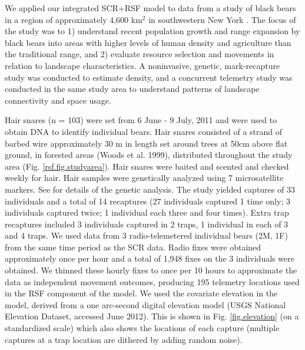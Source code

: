 \documentclass[12pt]{article}
\begin{document}
We applied our integrated SCR+RSF model to data from a study of black bears in a
region of approximately 4,600 km$^2$ in southwestern New York \citep{sun:2013}.
 The focus of the study was to 1) understand recent
population growth and range expansion by black bears into areas with
higher levels of human density and agriculture than the traditional
range, and 2) evaluate resource selection and movements in relation to
landscape characteristics.  A noninvasive, genetic, mark-recapture
study was conducted to estimate density, and a concurrent telemetry
study was conducted in the same study area to understand patterns of
landscape connectivity and space usage.

Hair snares (n = 103) were set from 6 June - 9 July, 2011 and were
used to obtain DNA to identify individual bears.  Hair snares
consisted of a strand of barbed wire approximately 30 m in length set
around trees at 50cm above flat ground, in forested areas (Woods et
al. 1999), distributed throughout the study area (Fig. \ref{rsf.fig.studyarea}). Hair snares
were baited and scented and checked weekly for hair. Hair samples were
genetically analyzed using 7 microsatellite markers. See \citet{sun:2013}
for details of the genetic analysis.
 The study yielded
captures of 33 individuals and a total of 14 recaptures (27
individuals captured 1 time only; 3 individuals captured twice; 1
individual each three and four times). Extra trap recaptures included
3 individuals captured in 2 traps, 1 individual in each of 3 and 4
traps.  We used data from 3 radio-telemetered individual bears (2M,
1F) from the same time period as the SCR data. Radio fixes were
obtained approximately once per hour and a total of 1,948 fixes on the
3 individuals were obtained. We thinned these hourly fixes to once per
10 hours to approximate the data as independent movement outcomes,
producing 195 telemetry locations used in the RSF component of the
model.  We used the covariate elevation in the model, derived from a
one arc-second digital elevation model (USGS National Elevation
Dataset, accessed June 2012).  This is shown in
Fig. \ref{fig.elevation} (on a
standardized scale) which also shows the locations of each capture
(multiple captures at a trap location are dithered by adding random
noise).
\end{document}
